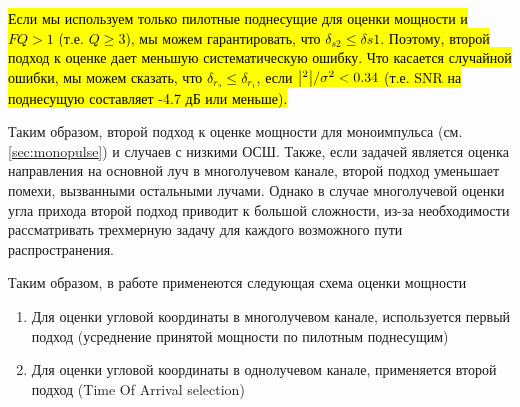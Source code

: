 \hl{
Если мы используем только пилотные поднесущие для оценки мощности и $FQ > 1$ (т.е. $Q\geq 3$),
мы можем гарантировать, что $\delta_{s2} \leq \delta{s1}$. Поэтому, второй подход к оценке дает меньшую
систематическую ошибку. Что касается случайной ошибки, мы можем сказать, что $\delta_{r_2} \leq \delta_{r_1}$, если
$\abs{^2}/\sigma^2 < 0.34$ (т.е. SNR на поднесущую составляет -4.7 дБ или меньше).
}

Таким образом, второй подход к оценке мощности для моноимпульса (см. \ref{sec:monopulse}) и случаев с
низкими ОСШ. Также, если задачей является оценка направления на основной луч в
многолучевом канале, второй подход уменьшает помехи, вызванными остальными лучами.
Однако в случае многолучевой оценки угла прихода второй подход приводит к
большой сложности, из-за необходимости рассматривать трехмерную задачу для
каждого возможного пути распространения.

Таким образом, в работе применеются следующая схема оценки мощности
\begin{enumerate}
    \item Для оценки угловой координаты в многолучевом канале, используется первый подход (усреднение принятой мощности по пилотным поднесущим) \\
    \item Для оценки угловой координаты в однолучевом канале, применяется второй подход (Time Of Arrival selection) \\
\end{enumerate}
